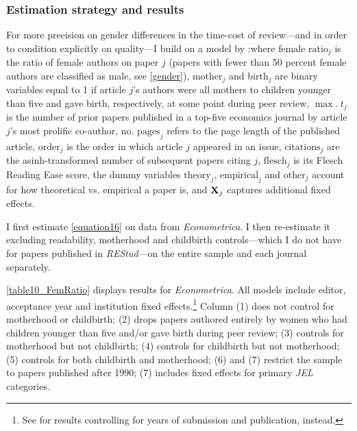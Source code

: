 

\subsubsection{Estimation strategy and results}
\label{durationresults}

For more precision on gender differences in the time-cost of review---and in order to condition explicitly on quality---I build on a model by  \citet{Ellison2002a}:where $\text{female ratio}_j$ is the ratio of female authors on paper $j$ (papers with fewer than 50 percent female authors are classified as male, see \autoref{gender}), $\text{mother}_j$ and $\text{birth}_j$ are binary variables equal to 1 if article $j$'s authors were all mothers to children younger than five and gave birth, respectively, at some point during peer review, $\max.~t_j$ is the number of prior papers published in a top-five economics journal by article $j$'s most prolific co-author, $\text{no. pages}_j$ refers to the page length of the published article, $\text{order}_j$ is the order in which article $j$ appeared in an issue, $\text{citations}_j$ are the asinh-transformed number of subsequent papers citing $j$, $\text{flesch}_j$ is its Flesch Reading Ease score, the dummy variables $\text{theory}_j$, $\text{empirical}_j$ and $\text{other}_j$ account for how theoretical vs. empirical a paper is, and $\mathbf{X}_j$ captures additional fixed effects.

I first estimate \autoref{equation16} on data from \emph{Econometrica}. I then re-estimate it excluding readability, motherhood and childbirth controls---which I do not have for papers published in \emph{REStud}---on the entire sample and each journal separately.



\autoref{table10_FemRatio} displays results for \emph{Econometrica}. All models include editor, acceptance year and institution fixed effects.\footnote{See  for results controlling for years of submission and publication, instead.} Column (1) does not control for motherhood or childbirth; (2) drops papers authored entirely by women who had children younger than five and\slash or gave birth during peer review; (3) controls for motherhood but not childbirth; (4) controls for childbirth but not motherhood; (5) controls for both childbirth and motherhood; (6) and (7) restrict the sample to papers published after 1990; (7) includes fixed effects for primary \emph{JEL} categories.

